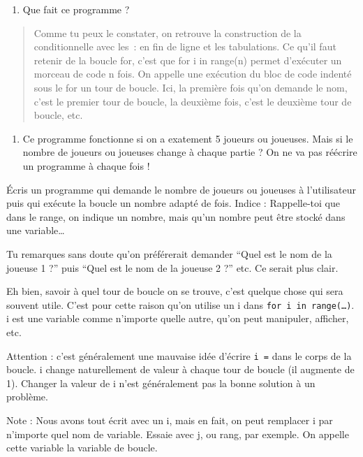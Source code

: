 \documentclass[a4paper,french,11pt]{article}
\providecommand{\tightlist}{%
  \setlength{\itemsep}{0pt}\setlength{\parskip}{0pt}}
\begin{document}
\begin{enumerate}
\def\labelenumi{\arabic{enumi}.}
\tightlist
\item
  Que fait ce programme ?
\end{enumerate}

\begin{quote}
Comme tu peux le constater, on retrouve la construction de la
conditionnelle avec les~: en fin de ligne et les tabulations. Ce qu'il
faut retenir de la boucle for, c'est que for i in range(n) permet
d'exécuter un morceau de code n fois. On appelle une exécution du bloc
de code indenté sous le for un tour de boucle. Ici, la première fois
qu'on demande le nom, c'est le premier tour de boucle, la deuxième fois,
c'est le deuxième tour de boucle, etc.
\end{quote}

\begin{enumerate}
\def\labelenumi{\arabic{enumi}.}
\setcounter{enumi}{1}
\tightlist
\item
  Ce programme fonctionne si on a exatement 5 joueurs ou joueuses. Mais
  si le nombre de joueurs ou joueuses change à chaque partie ? On ne va
  pas réécrire un programme à chaque fois !
\end{enumerate}

Écris un programme qui demande le nombre de joueurs ou joueuses à
l'utilisateur puis qui exécute la boucle un nombre adapté de fois.
Indice : Rappelle-toi que dans le range, on indique un nombre, mais
qu'un nombre peut être stocké dans une variable\ldots{}

Tu remarques sans doute qu'on préférerait demander ``Quel est le nom de
la joueuse 1 ?'' puis ``Quel est le nom de la joueuse 2 ?'' etc. Ce
serait plus clair.

Eh bien, savoir à quel tour de boucle on se trouve, c'est quelque chose
qui sera souvent utile. C'est pour cette raison qu'on utilise un i dans
\texttt{for i in range(…)}. i est une variable comme
n'importe quelle autre, qu'on peut manipuler, afficher, etc.

Attention : c'est généralement une mauvaise idée d'écrire
\texttt{i =} dans le corps de la boucle. i change
naturellement de valeur à chaque tour de boucle (il augmente de 1).
Changer la valeur de i n'est généralement pas la bonne solution à un
problème.

Note : Nous avons tout écrit avec un i, mais en fait, on peut remplacer
i par n'importe quel nom de variable. Essaie avec j, ou rang, par
exemple. On appelle cette variable la variable de boucle.
\end{document}
